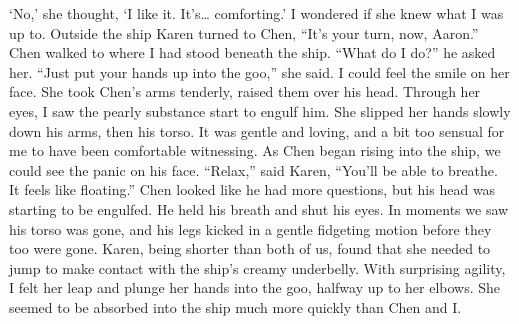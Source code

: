 \documentclass[a4paper]{article}
\begin{document}
‘No,’ she thought, ‘I like it. It’s… comforting.’
I wondered if she knew what I was up to.
Outside the ship Karen turned to Chen, “It’s your turn, now, Aaron.”
Chen walked to where I had stood beneath the ship. “What do I do?” he asked her.
“Just put your hands up into the goo,” she said. I could feel the smile on her face.
She took Chen’s arms tenderly, raised them over his head. Through her eyes, I saw the pearly substance start to engulf him. She slipped her hands slowly down his arms, then his torso. It was gentle and loving, and a bit too sensual for me to have been comfortable witnessing.
As Chen began rising into the ship, we could see the panic on his face.
“Relax,” said Karen, “You’ll be able to breathe. It feels like floating.”
Chen looked like he had more questions, but his head was starting to be engulfed. He held his breath and shut his eyes.
In moments we saw his torso was gone, and his legs kicked in a gentle fidgeting motion before they too were gone.
Karen, being shorter than both of us, found that she needed to jump to make contact with the ship’s creamy underbelly. With surprising agility, I felt her leap and plunge her hands into the goo, halfway up to her elbows.
She seemed to be absorbed into the ship much more quickly than Chen and I.
\end{document}
